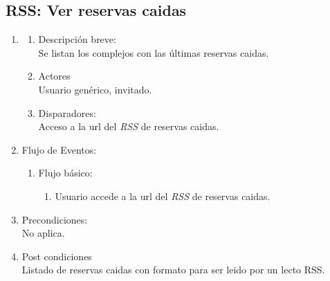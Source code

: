 \documentclass[a4paper,11pt]{article}
\begin{document}
\subsection{RSS: Ver reservas caidas}
\begin{enumerate}
    \item
        \begin{enumerate}
            \item Descripción breve: \\
                Se listan los complejos con las últimas reservas caidas.
            \item Actores \\
                Usuario genérico, invitado.
            \item Disparadores: \\
                Acceso a la url del \emph{RSS} de reservas caidas.
        \end{enumerate}
    \item Flujo de Eventos:
        \begin{enumerate}
            \item Flujo básico:
		\begin{enumerate}                
		\item Usuario accede a la url del \emph{RSS} de reservas caidas.
        	\end{enumerate}
	\end{enumerate}
    \item Precondiciones: \\
        No aplica.
    \item Post condiciones \\
        Listado de reservas caidas con formato para ser leido por un lecto RSS.
\end{enumerate}

\end{document}
